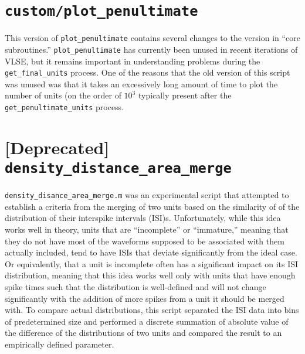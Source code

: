 \documentclass{article}
\begin{document}
\section{\texttt{custom/plot\_penultimate}}
This version of \texttt{plot\_penultimate} contains several changes to
the version in ``core subroutines.'' \texttt{plot\_penultimate} has
currently been unused in recent iterations of VLSE, but it remains
important in understanding problems during the
\texttt{get\_final\_units} process. One of the reasons that the old
version of this script was unused was that it takes an excessively long
amount of time to plot the number of units (on the order of
\ensuremath{10^3} typically present after the
\texttt{get\_penultimate\_units} process. 

\section{[Deprecated] \texttt{density\_distance\_area\_merge}}
\texttt{density\_disance\_area\_merge.m} was an experimental script
that attempted to establish a criteria from the merging of two units
based on the similarity of of the distribution of their interspike
intervals (ISI)s. 
Unfortunately, while this idea works well in theory, units that are
``incomplete'' or ``immature,'' meaning that they do not have most of
the waveforms supposed to be associated with them actually included,
tend to have ISIs that deviate significantly from the ideal case. Or
equivalently, that a unit is incomplete often has a significant impact
on its ISI distribution, meaning that this idea works well only with
units that have enough spike times such that the distribution is
well-defined and will not change significantly with the addition of more
spikes from a unit it should be merged with. To compare actual
distributions, this script separated the ISI data into bins of
predetermined size and performed a discrete summation of absolute value
of the difference of the distributions of two units and compared the
result to an empirically defined parameter.
\end{document}

